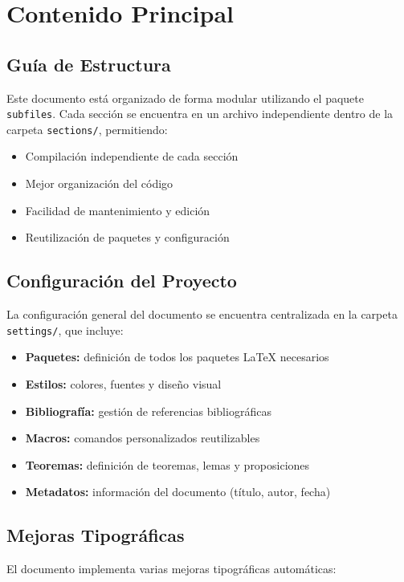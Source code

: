\documentclass[/work/src/main.tex]{subfiles}
\begin{document}
\section{Contenido Principal}

\subsection{Guía de Estructura}
Este documento está organizado de forma modular utilizando el paquete \texttt{subfiles}. Cada sección se encuentra en un archivo independiente dentro de la carpeta \texttt{sections/}, permitiendo:

\begin{itemize}
    \item Compilación independiente de cada sección
    \item Mejor organización del código
    \item Facilidad de mantenimiento y edición
    \item Reutilización de paquetes y configuración
\end{itemize}

\subsection{Configuración del Proyecto}
La configuración general del documento se encuentra centralizada en la carpeta \texttt{settings/}, que incluye:

\begin{itemize}
    \item \textbf{Paquetes:} definición de todos los paquetes LaTeX necesarios
    \item \textbf{Estilos:} colores, fuentes y diseño visual
    \item \textbf{Bibliografía:} gestión de referencias bibliográficas
    \item \textbf{Macros:} comandos personalizados reutilizables
    \item \textbf{Teoremas:} definición de teoremas, lemas y proposiciones
    \item \textbf{Metadatos:} información del documento (título, autor, fecha)
\end{itemize}

\subsection{Mejoras Tipográficas}
El documento implementa varias mejoras tipográficas automáticas:
\end{document}
